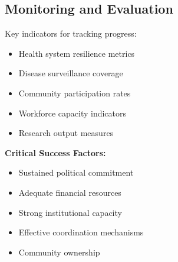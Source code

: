 \subsection{Monitoring and Evaluation}
Key indicators for tracking progress:

\begin{itemize}
    \item Health system resilience metrics
    \item Disease surveillance coverage
    \item Community participation rates
    \item Workforce capacity indicators
    \item Research output measures
\end{itemize}

\begin{keymessage}
\textbf{Critical Success Factors:}
\begin{itemize}
    \item Sustained political commitment
    \item Adequate financial resources
    \item Strong institutional capacity
    \item Effective coordination mechanisms
    \item Community ownership
\end{itemize}
\end{keymessage}
